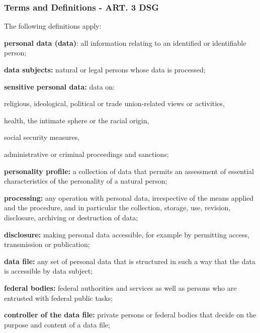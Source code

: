 \subsubsection{Terms and Definitions - ART. 3 DSG}
The following definitions apply:
\begin{compactenum}	
	\item \textbf{personal data (data)}: all information relating to an identified or identifiable person;
	\item \textbf{data subjects:} natural or legal persons whose data is processed;
	\item \textbf{sensitive personal data:} data on:
	\begin{compactenum}	
		\item religious, ideological, political or trade union-related views or activities,
		\item health, the intimate sphere or the racial origin,
		\item social security measures,
		\item administrative or criminal proceedings and sanctions;
	\end{compactenum}
	\item \textbf{personality profile:} a collection of data that permits an assessment of essential characteristics of the personality of a natural person;
	\item \textbf{processing:} any operation with personal data, irrespective of the means applied and the procedure, and in particular the collection, storage, use, revision, disclosure, archiving or destruction of data;
	\item \textbf{disclosure:} making personal data accessible, for example by permitting access, transmission or publication;
	\item \textbf{data file:} any set of personal data that is structured in such a way that the data is accessible by data subject;
	\item \textbf{federal bodies:} federal authorities and services as well as persons who are entrusted with federal public tasks;
	\item \textbf{controller of the data file:} private persons or federal bodies that decide on the purpose and content of a data file;
\end{compactenum}

